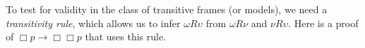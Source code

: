 To test for validity in the class of transitive frames (or models), we need a
\emph{transitivity rule}, which allows us to infer $\omega R\upsilon$ from
$\omega R\nu$ and $\nu R\upsilon$. Here is a proof of $\Box p \to \Box\Box p$
that uses this rule.

\begin{center}
\end{center}

